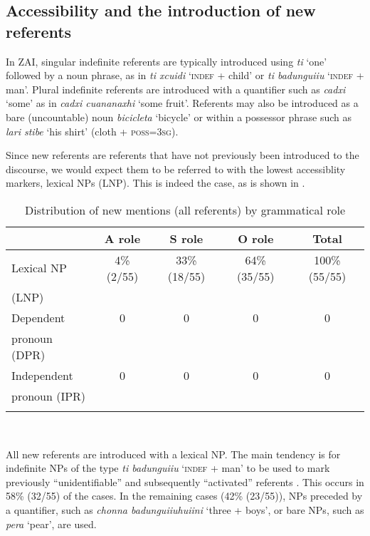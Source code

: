 \subsection{Accessibility and the introduction of new referents}\label{accessiblityandnew}

In ZAI, singular indefinite referents are typically introduced using \textit{ti} `one' followed by a noun phrase, as in \textit{ti xcuidi} `\textsc{indef} + child' or \textit{ti badunguiiu} `\textsc{indef} + man'. Plural indefinite referents are introduced with a quantifier such as \textit{cadxi} `some' as in \textit{cadxi cuananaxhi} `some fruit'. Referents may also be introduced as a bare (uncountable) noun \textit{bicicleta} `bicycle'  or within a possessor phrase such as \textit{lari stibe} `his shirt' (cloth + \textsc{poss}=3\textsc{sg}).


Since new referents are referents that have not previously been introduced to the discourse, we would expect them to be referred to with the lowest accessiblity markers, lexical NPs (LNP). This is indeed the case, as is shown in .

\begin{table}  

\caption{{Distribution of new mentions (all referents) by grammatical role}}
\begin{tabular}{ l  c  c  c  c }
\lsptoprule
 & A role & S role & O role & Total\\

\midrule
  {Lexical NP} & 4{\%} (2/55) & 33{\%} (18/55) & 64{\%} (35/55) & 100{\%} (55/55) \\
 (LNP) & & & & \\

\midrule
  {Dependent} & 0 & 0  &  0 &  0  \\
pronoun (DPR) & & & & \\

\midrule
  {Independent} & 0 & 0  & 0 &  0 \\
 pronoun (IPR) & & & & \\

\lspbottomrule
\end{tabular}\\
\label{newreferents}

\end{table} 
All new referents are introduced with a lexical NP. The main tendency is for indefinite NPs of the type \textit{ti badunguiiu} {`}\textsc{indef} + man{'} to be used to mark previously ``unidentifiable'' and subsequently ``activated'' referents \citep{lambrecht1994}. This occurs in 58{\%} (32/55) of the cases. In the remaining cases (42{\%} (23/55)), NPs preceded by a quantifier, such as \textit{chonna badunguiiuhuiini} {`}three + boys{'}, or bare NPs, such as \textit{pera} `pear', are used. 

